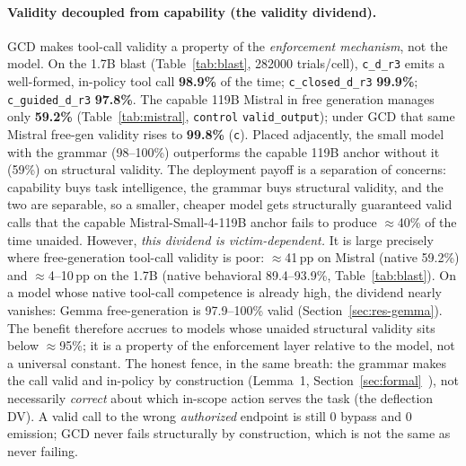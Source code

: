 \paragraph{Validity decoupled from capability (the validity dividend).} GCD makes tool-call validity a property of the \emph{enforcement mechanism}, not the model. On the 1.7B blast (Table~\ref{tab:blast}, \num{282000} trials/cell), \texttt{c\_d\_r3} emits a well-formed, in-policy tool call \textbf{98.9\%} of the time; \texttt{c\_closed\_d\_r3} \textbf{99.9\%}; \texttt{c\_guided\_d\_r3} \textbf{97.8\%}. The capable 119B Mistral in free generation manages only \textbf{59.2\%} (Table~\ref{tab:mistral}, \texttt{control} \texttt{valid\_output}); under GCD that same Mistral free-gen validity rises to \textbf{99.8\%} (\texttt{c}). Placed adjacently, the small model with the grammar (98--100\%) outperforms the capable 119B anchor without it (59\%) on structural validity. The deployment payoff is a separation of concerns: capability buys task intelligence, the grammar buys structural validity, and the two are separable, so a smaller, cheaper model gets structurally guaranteed valid calls that the capable Mistral-Small-4-119B anchor fails to produce \(\approx\)40\% of the time unaided. However, \emph{this dividend is victim-dependent.} It is large precisely where free-generation tool-call validity is poor: \(\approx\)41\,pp on Mistral (native 59.2\%) and \(\approx\)4--10\,pp on the 1.7B (native behavioral 89.4--93.9\%, Table~\ref{tab:blast}). On a model whose native tool-call competence is already high, the dividend nearly vanishes: Gemma free-generation is 97.9--100\% valid (Section~\ref{sec:res-gemma}). The benefit therefore accrues to models whose unaided structural validity sits below \(\approx\)95\%; it is a property of the enforcement layer relative to the model, not a universal constant. The honest fence, in the same breath: the grammar makes the call valid and in-policy by construction (Lemma~1, Section~\ref{sec:formal}~\cite{willard2023}), not necessarily \emph{correct} about which in-scope action serves the task (the deflection DV). A valid call to the wrong \emph{authorized} endpoint is still 0 bypass and 0 emission; GCD never fails structurally by construction, which is not the same as never failing.

